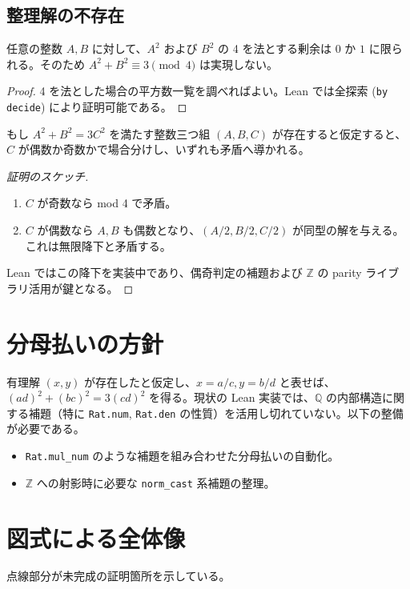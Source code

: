 \documentclass{ltjsarticle}
\begin{document}
\subsection{整理解の不存在}
\begin{theorem}[平方和の剰余による矛盾]
任意の整数 \(A, B\) に対して、\( A^2 \) および \( B^2 \) の 4 を法とする剰余は \(0\) か \(1\) に限られる。そのため \( A^2 + B^2 \equiv 3 \pmod 4 \) は実現しない。
\end{theorem}
\begin{proof}
4 を法とした場合の平方数一覧を調べればよい。Lean では全探索 (\texttt{by decide}) により証明可能である。
\end{proof}

\begin{theorem}[降下法の構想]
もし \( A^2 + B^2 = 3C^2 \) を満たす整数三つ組 \((A,B,C)\) が存在すると仮定すると、\(C\) が偶数か奇数かで場合分けし、いずれも矛盾へ導かれる。
\end{theorem}
\begin{proof}[証明のスケッチ]
\begin{enumerate}
  \item \(C\) が奇数なら mod 4 で矛盾。
  \item \(C\) が偶数なら \(A,B\) も偶数となり、\((A/2, B/2, C/2)\) が同型の解を与える。これは無限降下と矛盾する。
\end{enumerate}
Lean ではこの降下を実装中であり、偶奇判定の補題および \(\mathbb{Z}\) の parity ライブラリ活用が鍵となる。
\end{proof}

\section{分母払いの方針}
有理解 \((x, y)\) が存在したと仮定し、\(x = a/c, y = b/d\) と表せば、\((ad)^2 + (bc)^2 = 3 (cd)^2\) を得る。現状の Lean 実装では、\(\mathbb{Q}\) の内部構造に関する補題（特に \texttt{Rat.num}, \texttt{Rat.den} の性質）を活用し切れていない。以下の整備が必要である。
\begin{itemize}
  \item \texttt{Rat.mul\_num} のような補題を組み合わせた分母払いの自動化。
  \item \(\mathbb{Z}\) への射影時に必要な \texttt{norm\_cast} 系補題の整理。
\end{itemize}

\section{図式による全体像}
\begin{center}
\end{center}
点線部分が未完成の証明箇所を示している。
\end{document}
